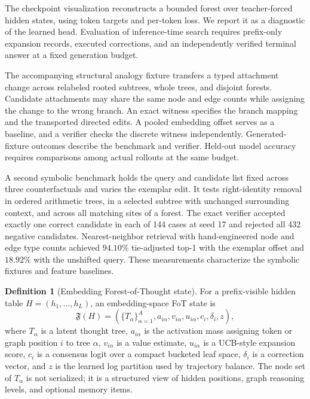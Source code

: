 \documentclass[11pt]{article}
\theoremstyle{definition}
\newtheorem{definition}{Definition}[section]
\theoremstyle{plain}
\theoremstyle{remark}
\numberwithin{equation}{section}
\begin{document}
The checkpoint visualization reconstructs a bounded forest over teacher-forced hidden states, using token targets and per-token loss. We report it as a diagnostic of the learned head. Evaluation of inference-time search requires prefix-only expansion records, executed corrections, and an independently verified terminal answer at a fixed generation budget.

The accompanying structural analogy fixture transfers a typed attachment change across relabeled rooted subtrees, whole trees, and disjoint forests. Candidate attachments may share the same node and edge counts while assigning the change to the wrong branch. An exact witness specifies the branch mapping and the transported directed edits. A pooled embedding offset serves as a baseline, and a verifier checks the discrete witness independently. Generated-fixture outcomes describe the benchmark and verifier. Held-out model accuracy requires comparisons among actual rollouts at the same budget.

A second symbolic benchmark holds the query and candidate list fixed across three counterfactuals and varies the exemplar edit. It tests right-identity removal in ordered arithmetic trees, in a selected subtree with unchanged surrounding context, and across all matching sites of a forest. The exact verifier accepted exactly one correct candidate in each of 144 cases at seed 17 and rejected all 432 negative candidates. Nearest-neighbor retrieval with hand-engineered node and edge type counts achieved $94.10\%$ tie-adjusted top-1 with the exemplar offset and $18.92\%$ with the unshifted query. These measurements characterize the symbolic fixtures and feature baselines.

\begin{definition}[Embedding Forest-of-Thought state]
For a prefix-visible hidden table $H=(h_1,\ldots,h_L)$, an embedding-space FoT state is
\begin{equation}
  \mathfrak F(H)=
  \left(
    \{T_\alpha\}_{\alpha=1}^{A},
    a_{i\alpha},
    v_{i\alpha},
    u_{i\alpha},
    c_i,
    \delta_i,
    z
  \right),
\end{equation}
where $T_\alpha$ is a latent thought tree, $a_{i\alpha}$ is the activation mass assigning token or graph position $i$ to tree $\alpha$, $v_{i\alpha}$ is a value estimate, $u_{i\alpha}$ is a UCB-style expansion score, $c_i$ is a consensus logit over a compact bucketed leaf space, $\delta_i$ is a correction vector, and $z$ is the learned log partition used by trajectory balance.  The node set of $T_\alpha$ is not serialized; it is a structured view of hidden positions, graph reasoning levels, and optional memory items.
\end{definition}
\end{document}
